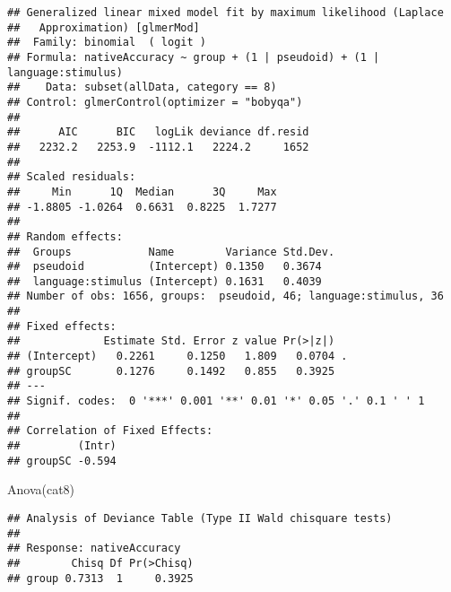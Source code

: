 \documentclass[
]{article}
\newenvironment{Shaded}{\begin{snugshade}}{\end{snugshade}}
\newcommand{\AttributeTok}[1]{\textcolor[rgb]{0.77,0.63,0.00}{#1}}
\newcommand{\DecValTok}[1]{\textcolor[rgb]{0.00,0.00,0.81}{#1}}
\newcommand{\FunctionTok}[1]{\textcolor[rgb]{0.00,0.00,0.00}{#1}}
\newcommand{\NormalTok}[1]{#1}
\newcommand{\OtherTok}[1]{\textcolor[rgb]{0.56,0.35,0.01}{#1}}
\newcommand{\SpecialCharTok}[1]{\textcolor[rgb]{0.00,0.00,0.00}{#1}}
\newcommand{\StringTok}[1]{\textcolor[rgb]{0.31,0.60,0.02}{#1}}
\begin{document}
\begin{verbatim}
## Generalized linear mixed model fit by maximum likelihood (Laplace
##   Approximation) [glmerMod]
##  Family: binomial  ( logit )
## Formula: nativeAccuracy ~ group + (1 | pseudoid) + (1 | language:stimulus)
##    Data: subset(allData, category == 8)
## Control: glmerControl(optimizer = "bobyqa")
## 
##      AIC      BIC   logLik deviance df.resid 
##   2232.2   2253.9  -1112.1   2224.2     1652 
## 
## Scaled residuals: 
##     Min      1Q  Median      3Q     Max 
## -1.8805 -1.0264  0.6631  0.8225  1.7277 
## 
## Random effects:
##  Groups            Name        Variance Std.Dev.
##  pseudoid          (Intercept) 0.1350   0.3674  
##  language:stimulus (Intercept) 0.1631   0.4039  
## Number of obs: 1656, groups:  pseudoid, 46; language:stimulus, 36
## 
## Fixed effects:
##             Estimate Std. Error z value Pr(>|z|)  
## (Intercept)   0.2261     0.1250   1.809   0.0704 .
## groupSC       0.1276     0.1492   0.855   0.3925  
## ---
## Signif. codes:  0 '***' 0.001 '**' 0.01 '*' 0.05 '.' 0.1 ' ' 1
## 
## Correlation of Fixed Effects:
##         (Intr)
## groupSC -0.594
\end{verbatim}

\begin{Shaded}
\begin{Highlighting}[]
\FunctionTok{Anova}\NormalTok{(cat8)}
\end{Highlighting}
\end{Shaded}

\begin{verbatim}
## Analysis of Deviance Table (Type II Wald chisquare tests)
## 
## Response: nativeAccuracy
##        Chisq Df Pr(>Chisq)
## group 0.7313  1     0.3925
\end{verbatim}

\begin{Shaded}
\end{Shaded}
\end{document}
